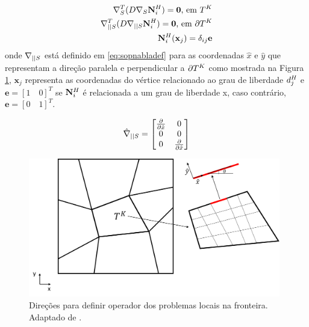 \begin{subequations} \label{eq:problemaslocais}
\begin{align}
\sopnabla ^T (D \sopnabla \basefunctioncoarse)  = \mathbf{0} \text{,   em   } \coarseelement \label{eq:operadorlocal}\\
\sopnablafront ^ T ( D  \sopnablafront \basefunctioncoarse) = \mathbf{0}  \text{,   em   } \partial \coarseelement  \label{eq:operadoraresta}\\
\basefunctioncoarse(\mathbf{x}_j) = \delta_{ij} \mathbf{e}
\label{eq:valorvertice}
\end{align}
\end{subequations}
onde $\sopnablafront$ está definido em \eqref{eq:sopnabladef} para as coordenadas $\hat{x}$ e $\hat{y}$ que representam a direção paralela e perpendicular a $\partial \coarseelement$ como mostrada na Figura \ref{fig:direcoesoperadorfronteira}, $\mathbf{x}_j$ representa as coordenadas do vértice relacionado ao grau de liberdade $\freedomcoarse[j]$ e  $\mathbf{e} = [1\quad0]^T $ se $\basefunctioncoarse$ é relacionada a um grau de liberdade x, caso contrário,  $\mathbf{e}=[0\quad1]^T$.

\begin{equation}\label{eq:sopnabladef}
\sopnablafronthat = \begin{bmatrix}
\dxhat  & 0 \\ 
0 & 0 \\ 
0 & \dxhat 
\end{bmatrix}
\end{equation}

\begin{figure}[!htbp]
\centering
\includegraphics[width=11cm]{chap06/figs/direcoesoperadorfronteira.png}
\caption{Direções para definir operador dos problemas locais na fronteira. Adaptado de \cite{casteletto}.}
\label{fig:direcoesoperadorfronteira}
\end{figure}


